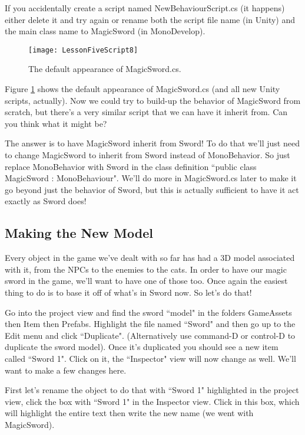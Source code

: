 \documentclass{article}
\begin{document}
If you accidentally create a script named NewBehaviourScript.cs (it happens) either delete it and try again or rename both the script file name (in Unity) and the main class name to MagicSword (in MonoDevelop).

\begin{figure}
  \texttt{[image: LessonFiveScript8]}
  \caption{The default appearance of MagicSword.cs.}
  \label{fig:LessonFiveScript8}
\end{figure}

Figure \ref{fig:LessonFiveScript8} shows the default appearance of MagicSword.cs (and all new Unity scripts, actually). Now we could try to build-up the behavior of MagicSword from scratch, but there's a very similar script that we can have it inherit from. Can you think what it might be? 

The answer is to have MagicSword inherit from Sword! To do that we'll just need to change MagicSword to inherit from Sword instead of MonoBehavior. So just replace MonoBehavior with Sword in the class definition ``public class MagicSword : MonoBehaviour". We'll do more in MagicSword.cs later to make it go beyond just the behavior of Sword, but this is actually sufficient to have it act exactly as Sword does! 

\subsection{Making the New Model}

Every object in the game we've dealt with so far has had a 3D model associated with it, from the NPCs to the enemies to the cats. In order to have our magic sword in the game, we'll want to have one of those too. Once again the easiest thing to do is to base it off of what's in Sword now. So let's do that!

Go into the project view and find the sword ``model" in the folders GameAssets then Item then Prefabs. Highlight the file named ``Sword" and then go up to the Edit menu and click ``Duplicate". (Alternatively use command-D or control-D to duplicate the sword model). Once it's duplicated you should see a new item called ``Sword 1". Click on it, the ``Inspector" view will now change as well. We'll want to make a few changes here. 

First let's rename the object to do that with ``Sword 1" highlighted in the project view, click the box with ``Sword 1" in the Inspector view. Click in this box, which will highlight the entire text then write the new name (we went with MagicSword). 
\end{document}
